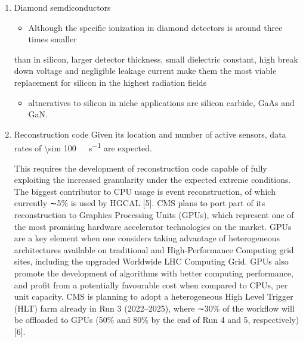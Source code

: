 \documentclass[11pt]{article}
\begin{document}
\begin{enumerate}
\begin{figure}
\texttt{[image: /home/bruno/org/PhD/Thesis/figures/hgcal/HGCAL3DView.pdf]}
\caption{\label{fig:hgcal_3d_view}Schematic 3D view of one endcap of the \ac{HGCAL}. Different subdetectors can be seen, such as the \ac{CE-E}, the \ac{CE-H} and the \ac{ETL}. Other sections are required for structural reasons, as for instance the brackets, on the right-most region of the right plot, which are meant to attach the \ac{HGCAL} to the muon chambers. The \ac{PM}, or neutron moderator, placed just in front of the \ac{CE-E}, reduces the number of neutron coming from the tracker. The two dashed lines give a rough idea on the location of one pair of cooling supply and return tubes, which are connected to the layers, and are placed every \SI{30}{\celsius}. The picture on the right provides a side view of the same endcap. Adapted from \cite{hgcalTDR}.}
\end{figure}
\item Diamond semdiconductors
\label{sec:org81691b1}
\begin{itemize}
\item Although the specific ionization in diamond detectors is around three times smaller
\end{itemize}
than in silicon, larger detector thickness, small dielectric constant, high break down
voltage and negligible leakage current make them the most viable replacement for
silicon in the highest radiation fields \cite{calorimetry_fabjan}
\begin{itemize}
\item altneratives to silicon in niche applications are silicon carbide, GaAs and GaN.
\end{itemize}
\item Reconstruction code
\label{sec:org0971189}
Given its location and number of active sensors, data rates of \SI{\sim 100}{\tera\byte\per\second} are expected.

This requires the development of reconstruction code capable of fully exploiting the increased granularity under the expected extreme conditions.
The biggest contributor to CPU usage is event reconstruction, of which currently ∼5\% is
used by HGCAL [5]. CMS plans to port part of its reconstruction to Graphics Processing
Units (GPUs), which represent one of the most promising hardware accelerator technologies on
the market. GPUs are a key element when one considers taking advantage of heterogeneous
architectures available on traditional and High-Performance Computing grid sites, including the
upgraded Worldwide LHC Computing Grid. GPUs also promote the development of algorithms
with better computing performance, and profit from a potentially favourable cost when compared
to CPUs, per unit capacity. CMS is planning to adopt a heterogeneous High Level Trigger (HLT)
farm already in Run 3 (2022–2025), where ∼30\% of the workflow will be offloaded to GPUs (50\%
and 80\% by the end of Run 4 and 5, respectively) [6]. 


\end{enumerate}
\end{document}
